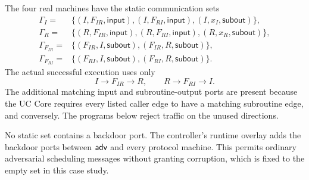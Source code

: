 \begin{definition}
\label{def:dhke-communication-sets}
\notready
The four real machines have the static communication sets
\[
\begin{aligned}
  \Gamma_I={}&
    \{(I,F_{IR},\mathsf{input}),
      (I,F_{RI},\mathsf{input}),
      (I,x_I,\mathsf{subout})\},\\
  \Gamma_R={}&
    \{(R,F_{IR},\mathsf{input}),
      (R,F_{RI},\mathsf{input}),
      (R,x_R,\mathsf{subout})\},\\
  \Gamma_{F_{IR}}={}&
    \{(F_{IR},I,\mathsf{subout}),
      (F_{IR},R,\mathsf{subout})\},\\
  \Gamma_{F_{RI}}={}&
    \{(F_{RI},I,\mathsf{subout}),
      (F_{RI},R,\mathsf{subout})\}.
\end{aligned}
\]
The actual successful execution uses only
\[
  I\longrightarrow F_{IR}\longrightarrow R,
  \qquad
  R\longrightarrow F_{RI}\longrightarrow I.
\]
The additional matching input and subroutine-output ports are present because
the UC Core requires every listed caller edge to have a matching subroutine
edge, and conversely.  The programs below reject traffic on the unused
directions.

No static set contains a backdoor port.  The controller's runtime overlay adds
the backdoor ports between \(\mathsf{adv}\) and every protocol machine.  This permits
ordinary adversarial scheduling messages without granting corruption, which
is fixed to the empty set in this case study.
\end{definition}

